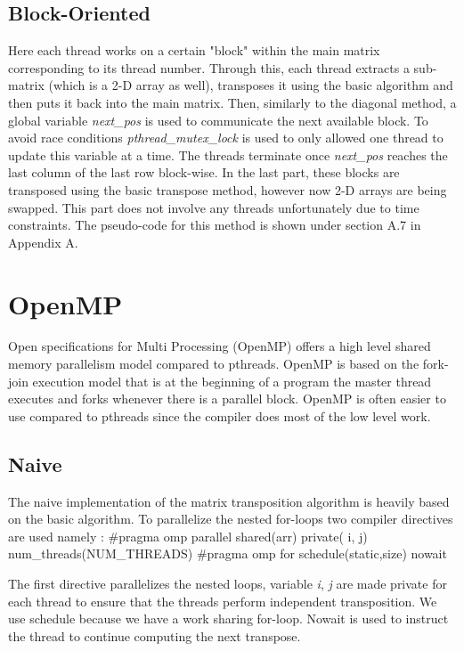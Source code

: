 \documentclass[10pt,journal]{article}
\begin{document}
\newline 

\subsection{Block-Oriented}
Here each thread works on a certain "block" within the main matrix corresponding to its thread number. Through this, each thread extracts a sub-matrix (which is a 2-D array as well), transposes it using the basic algorithm and then puts it back into the main matrix. Then, similarly to the diagonal method, a global variable \textit {next\_pos} is used to communicate the next available block. To avoid race conditions \textit {pthread\_mutex\_lock} is used to only allowed one thread to update this variable at a time. The threads terminate once \textit {next\_pos} reaches the last column of the last row block-wise. In the last part, these blocks are transposed using the basic transpose method, however now 2-D arrays are being swapped. This part does not involve any threads unfortunately due to time constraints. The pseudo-code for this method is shown under section A.7 in Appendix A. 

\section{OpenMP}

Open specifications for Multi Processing (OpenMP) offers a high level shared memory parallelism model compared to pthreads. OpenMP is based on the fork-join execution model that is at the beginning of a program the master thread executes and forks whenever there is a parallel block. OpenMP is often easier to use compared to pthreads since the compiler does most of the low level work.

\subsection{Naive}
The naive implementation of the matrix transposition algorithm is heavily based on the basic algorithm. To parallelize the nested for-loops two compiler directives are used namely :
\newline
{\#pragma omp parallel shared(arr) private( i, j) num\_threads(NUM\_THREADS) }
\newline
{\#pragma omp for schedule(static,size)  nowait}
\newline

The first directive parallelizes the nested loops, variable \textit{i}, \textit{j} are made private for each thread to ensure that the threads perform independent transposition. We use schedule because we have a work sharing for-loop. Nowait is used to instruct the thread to continue computing the next transpose.
\end{document}
